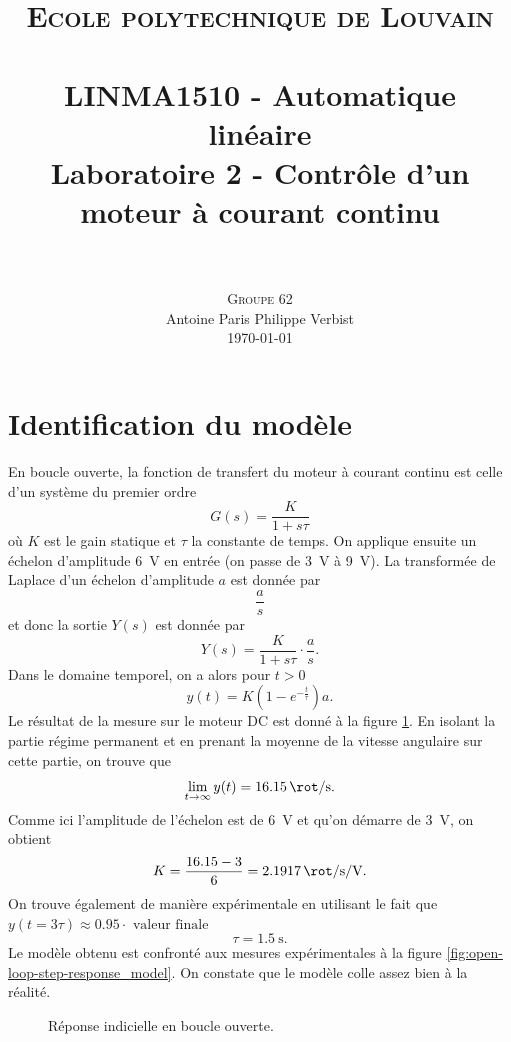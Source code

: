 \documentclass[frenchb, paper=a4, fontsize=11pt]{scrartcl}
\title{
		\usefont{OT1}{bch}{b}{n}
		\normalfont \normalsize \textsc{Ecole polytechnique de Louvain} \\ [25pt]
		\horrule{0.5pt} \\[0.4cm]
		\large LINMA1510 - Automatique linéaire\\
		\huge Laboratoire 2 - Contrôle d'un moteur à courant continu \\
		\horrule{1.5pt} \\[0.5cm]
}
\author{
		\normalfont
		\textsc{Groupe 62}\\
      	Antoine Paris\hspace{0.6cm} Philippe Verbist \\	
       	\normalsize
        \today
}
\date{}
\numberwithin{equation}{section}					%
\numberwithin{figure}{section}					%
\numberwithin{table}{section}						%
\begin{document}
\maketitle

\section{Identification du modèle}
En boucle ouverte, la fonction de transfert du moteur à courant
continu est celle d'un système du premier ordre
\begin{equation}
	G(s) = \frac{K}{1+s\tau}
\end{equation}
où $K$ est le gain statique et $\tau$ la constante de temps.
On applique ensuite un échelon d'amplitude \SI{6}{\volt} en
entrée (on passe de \SI{3}{\volt} à \SI{9}{\volt}). La
transformée de Laplace d'un échelon d'amplitude $a$ est donnée
par
\begin{equation}
	\frac{a}{s}
\end{equation}
et donc la sortie $Y(s)$ est donnée par
\begin{equation}
	Y(s) = \frac{K}{1+s\tau}\cdot\frac{a}{s}.
\end{equation}
Dans le domaine temporel, on a alors pour $t > 0$
\begin{equation}
	y(t) = K(1-e^{-\frac{t}{\tau}})a.
\end{equation}
Le résultat de la mesure sur le moteur DC est donné à la figure
\ref{fig:open-loop-step-response}. En isolant la partie régime
permanent et en prenant la moyenne de la vitesse angulaire sur
cette partie, on trouve que
\begin{equation}
	\lim_{t\to\infty} y(t) = \SI{16.15}{\rot\per\second}.
\end{equation}
Comme ici l'amplitude de l'échelon est de \SI{6}{\volt} et qu'on
démarre de \SI{3}{\volt}, on obtient
\begin{equation}
	K = \frac{16.15-3}{6} = \SI{2.1917}{\rot\per\second\per\volt}.
\end{equation}
On trouve également de manière expérimentale en utilisant le fait
que $y(t = 3\tau) \approx 0.95 \cdot \text{ valeur finale}$
\begin{equation}
	\tau = \SI{1.5}{\second}.
\end{equation}
Le modèle obtenu est confronté aux mesures expérimentales à la
figure \ref{fig:open-loop-step-response_model}. On constate que
le modèle colle assez bien à la réalité.

\begin{figure}[ht]
	\centering
	
	\caption{Réponse indicielle en boucle ouverte.}
	\label{fig:open-loop-step-response}
\end{figure}
\end{document}

